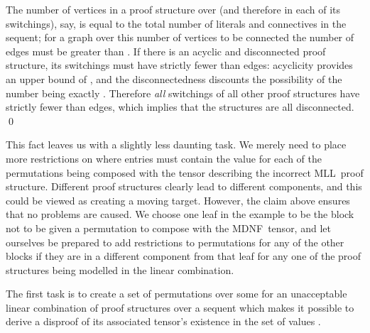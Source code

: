 \documentclass{LMCS}
\theoremstyle{plain}\newtheorem*{cLm}{Claim}
\newcommand{\mll}{MLL} \newcommand{\mall}{MALL}
\newcommand{\p}{} \newcommand{\N}{\mathbb{N}}
\begin{document}
  \p The number of vertices in a proof structure over  (and therefore in each of its switchings),  say, is equal to the total number of literals and connectives in the sequent; for a graph over this number of vertices to be connected the number of edges must be greater than . If there is an acyclic and disconnected proof structure, its switchings must have strictly fewer than  edges: acyclicity provides an upper bound of , and the disconnectedness discounts the possibility of the number being exactly . Therefore \emph{all} switchings of all other proof structures have strictly fewer than  edges, which implies that the structures are all disconnected. \qed
  
  This fact leaves us with a slightly less daunting task. We merely need to place more restrictions on where entries must contain the value  for each of the permutations being composed with the tensor describing the incorrect \mll~proof structure. Different proof structures clearly lead to different components, and this could be viewed as creating a moving target. However, the claim above ensures that no problems are caused. We choose one leaf in the example to be the block not to be given a permutation to compose with the MDNF~tensor, and let ourselves be prepared to add restrictions to permutations for any of the other blocks if they are in a different component from that leaf for any one of the proof structures being modelled in the linear combination.
  
  \p The first task is to create a set of permutations over some  for an unacceptable linear combination of proof structures over a sequent  which makes it possible to derive a disproof of its associated tensor's existence in the set of values .
  
\end{document}
